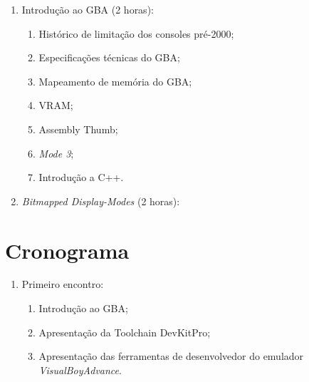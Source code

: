 \documentclass{article}
\begin{document}
\begin{enumerate}
    \item Introdução ao GBA (2 horas):
        \begin{enumerate}
            \item Histórico de limitação dos consoles pré-2000;
            \item Especificações técnicas do GBA\@;
            \item Mapeamento de memória do GBA\@;
            \item VRAM\@;
            \item Assembly Thumb;
            \item \textit{Mode 3};
            \item Introdução a C++.
        \end{enumerate}
    \item \textit{Bitmapped Display-Modes} (2 horas):
\end{enumerate}

\section{Cronograma}

\begin{enumerate}[label= (\alph*)]
    \item Primeiro encontro:
        \begin{enumerate}
            \item Introdução ao GBA\@;
            \item Apresentação da Toolchain DevKitPro;
            \item Apresentação das ferramentas de desenvolvedor do emulador
                \textit{VisualBoyAdvance}.
        \end{enumerate}
\end{enumerate}

\nocite{*}


\end{document}
